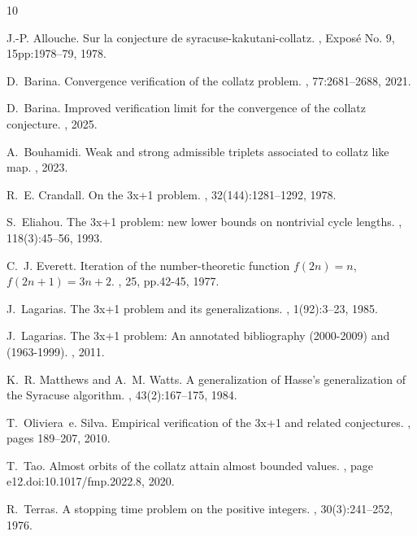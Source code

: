 \documentclass[11pt,a4paper]{article}
\begin{document}
\begin{thebibliography}{10}
	
	J.-P. Allouche.
	\newblock Sur la conjecture de syracuse-kakutani-collatz.
	, Exposé No.
	9, 15pp:1978--79, 1978.
	
	D.~Barina.
	\newblock Convergence verification of the collatz problem.
	, 77:2681–2688, 2021.
	
	D.~Barina.
	\newblock Improved verification limit for the convergence of the collatz
	conjecture.
	, 2025.
	
	A.~Bouhamidi.
	\newblock Weak and strong admissible triplets associated to collatz like map.
	, 2023.
	
	R.~E. Crandall.
	\newblock On the 3x+1 problem.
	, 32(144):1281--1292, 1978.
	
	S.~Eliahou.
	\newblock The 3x+1 problem: new lower bounds on nontrivial cycle lengths.
	, 118(3):45--56, 1993.
	
	C.~J. Everett.
	\newblock Iteration of the number-theoretic function $f(2n)=n$, $f(2n+1)=3n+2$.
	, 25, pp.42-45, 1977.
	
	J.~Lagarias.
	\newblock The 3x+1 problem and its generalizations.
	, 1(92):3--23, 1985.
	
	J.~Lagarias.
	\newblock The 3x+1 problem: An annotated bibliography (2000-2009) and
	(1963-1999).
	, 2011.
	
	K.~R. Matthews and A.~M. Watts.
	\newblock A generalization of {H}asse's generalization of the {S}yracuse
	algorithm.
	, 43(2):167--175, 1984.
	
	T.~Oliviera~e. Silva.
	\newblock Empirical verification of the 3x+1 and related conjectures.
	, pages 189--207, 2010.
	
	T.~Tao.
	\newblock Almost orbits of the collatz attain almost bounded values.
	, page
	e12.doi:10.1017/fmp.2022.8, 2020.
	
	R.~Terras.
	\newblock A stopping time problem on the positive integers.
	, 30(3):241--252, 1976.
	
\end{thebibliography}

\end{document}
